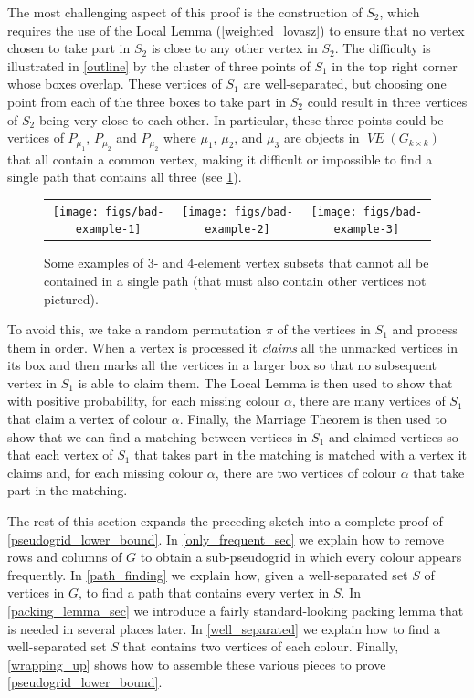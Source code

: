 \documentclass{patmorin}
\newcommand{\defin}[1]{\emph{\color{brightmaroon}#1}}
\DeclareMathOperator{\VE}{\mathit{VE}}
\begin{document}
The most challenging aspect of this proof is the construction of $S_2$, which requires the use of the Local Lemma (\cref{weighted_lovasz}) to ensure that no vertex chosen to take part in $S_2$ is close to any other vertex in $S_2$.  The difficulty is illustrated in \cref{outline} by the cluster of three points of $S_1$ in the top right corner whose boxes overlap.  These vertices of $S_1$ are well-separated, but choosing one point from each of the three boxes to take part in $S_2$ could result in three vertices of $S_2$ being very close to each other.  In particular, these three points could be vertices of $P_{\mu_1}$, $P_{\mu_2}$ and $P_{\mu_2}$ where $\mu_1$, $\mu_2$, and $\mu_3$ are objects in $\VE(G_{k\times k})$ that all contain a common vertex, making it difficult or impossible to find a single path that contains all three (see \cref{bad_examples}).

\begin{figure}
  \begin{center}
    \begin{tabular}{ccc}
      \texttt{[image: figs/bad-example-1]} &
      \texttt{[image: figs/bad-example-2]} &
      \texttt{[image: figs/bad-example-3]}
    \end{tabular}
  \end{center}
  \caption{Some examples of $3$- and $4$-element vertex subsets that cannot all be contained in a single path (that must also contain other vertices not pictured).}
  \label{bad_examples}
\end{figure}

To avoid this, we take a random permutation $\pi$ of the vertices in $S_1$ and process them in order.  When a vertex is processed it \defin{claims} all the unmarked vertices in its box and then marks all the vertices in a larger box so that no subsequent vertex in $S_1$ is able to claim them.  The Local Lemma is then used to show that with positive probability, for each missing colour $\alpha$, there are many vertices of $S_1$ that claim a vertex of colour $\alpha$.  Finally, the Marriage Theorem is then used to show that we can find a matching between vertices in $S_1$ and claimed vertices so that each vertex of $S_1$ that takes part in the matching is matched with a vertex it claims and, for each missing colour $\alpha$, there are two vertices of colour $\alpha$ that take part in the matching.

The rest of this section expands the preceding sketch into a complete proof of \cref{pseudogrid_lower_bound}. In \cref{only_frequent_sec} we explain how to remove rows and columns of $G$ to obtain a sub-pseudogrid in which every colour appears frequently.  In \cref{path_finding} we explain how, given a well-separated set $S$ of vertices in $G$, to find a path that contains every vertex in $S$.  In \cref{packing_lemma_sec} we introduce a fairly standard-looking packing lemma that is needed in several places later.  In \cref{well_separated} we explain how to find a well-separated set $S$ that contains two vertices of each colour. Finally, \cref{wrapping_up} shows how to assemble these various pieces to prove \cref{pseudogrid_lower_bound}.
\end{document}

